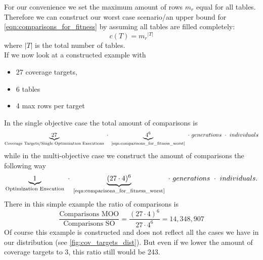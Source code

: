 For our convenience we set the maximum amount of rows $m_r$ equal for all tables. Therefore we can construct our worst case scenario/an upper bound for \cref{eqn:comparisons_for_fitness} by assuming all tables are filled completely:
\begin{equation}
	\label{eqn:comparisons_for_fitness_worst}
	c(T) = {m_r}^{|T|}
\end{equation} 
where $|T|$ is the total number of tables.\\
If we now look at a constructed example with
\begin{itemize}
	\item 27 coverage targets,
	\item 6 tables
	\item 4 max rows per target
\end{itemize}
In the single objective case the total amount of comparisons is
\begin{equation}
	\underbrace{27}_{\textrm{Coverage Targets/Single Optimization Executions}} ~\cdot~ \underbrace{4^6}_{\textrm{\Cref{eqn:comparisons_for_fitness_worst}}} ~\cdot~ generations ~\cdot~ individuals
\end{equation}
while in the multi-objective case we construct the amount of comparisons the following way
\begin{equation}
	\underbrace{1}_{\textrm{Optimization Execution}} ~\cdot~ \underbrace{(27 \cdot 4)^6}_{\textrm{\Cref{eqn:comparisons_for_fitness_worst}}} ~\cdot~ generations ~\cdot~ individuals.
\end{equation}
There in this simple example the ratio of comparisons is
\begin{equation}
	\label{eqn:theoretical_ratio_row_comparisons}
	\frac{\textrm{Comparisons MOO}}{\textrm{Comparisons SO}} = \frac{(27 \cdot 4)^6}{27 \cdot 4^6} = 14,348,907
\end{equation}
Of course this example is constructed and does not reflect all the cases we have in our distribution (see \cref{fig:cov_targets_dist}). But even if we lower the amount of coverage targets to 3, this ratio still would be 243.


